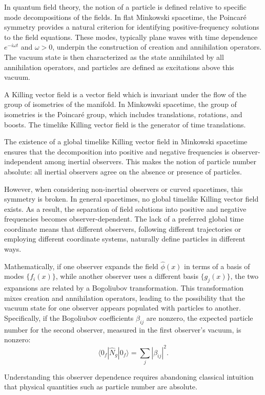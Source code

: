 In quantum field theory, the notion of a particle is defined relative to specific mode decompositions of the fields. In flat Minkowski spacetime, the Poincaré symmetry provides a natural criterion for identifying positive-frequency solutions to the field equations. These modes, typically plane waves with time dependence $e^{-i\omega t}$ and $\omega > 0$, underpin the construction of creation and annihilation operators. The vacuum state is then characterized as the state annihilated by all annihilation operators, and particles are defined as excitations above this vacuum.

A Killing vector field is a vector field which is invariant under the flow of the group of isometries of the manifold. In Minkowski spacetime, the group of isometries is the Poincaré group, which includes translations, rotations, and boosts. The timelike Killing vector field is the generator of time translations.

The existence of a global timelike Killing vector field in Minkowski spacetime ensures that the decomposition into positive and negative frequencies is observer-independent among inertial observers. This makes the notion of particle number absolute: all inertial observers agree on the absence or presence of particles.

However, when considering non-inertial observers or curved spacetimes, this symmetry is broken. In general spacetimes, no global timelike Killing vector field exists. As a result, the separation of field solutions into positive and negative frequencies becomes observer-dependent. The lack of a preferred global time coordinate means that different observers, following different trajectories or employing different coordinate systems, naturally define particles in different ways.

Mathematically, if one observer expands the field $\hat{\phi}(x)$ in terms of a basis of modes $\{f_i(x)\}$, while another observer uses a different basis $\{g_j(x)\}$, the two expansions are related by a Bogoliubov transformation. This transformation mixes creation and annihilation operators, leading to the possibility that the vacuum state for one observer appears populated with particles to another. Specifically, if the Bogoliubov coefficients $\beta_{ij}$ are nonzero, the expected particle number for the second observer, measured in the first observer's vacuum, is nonzero:
\[
\langle 0_f | \hat{N}_g | 0_f \rangle = \sum_j |\beta_{ij}|^2.
\]

Understanding this observer dependence requires abandoning classical intuition that physical quantities such as particle number are absolute.

